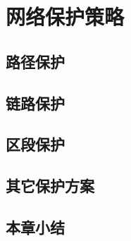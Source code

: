 \section{网络保护策略}
\subsection{路径保护}
\subsection{链路保护}
\subsection{区段保护}
\subsection{其它保护方案}
\subsection{本章小结}

